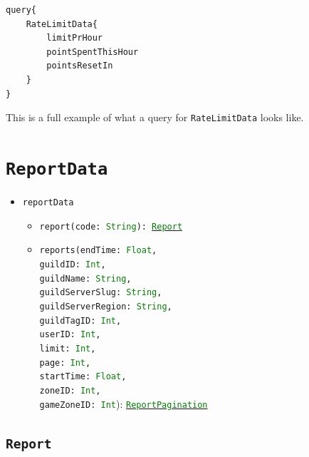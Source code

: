 \documentclass[10pt, a4paper]{memoir}
\numberwithin{equation}{section}
\theoremstyle{plain}
\theoremstyle{defp}
\theoremstyle{dotless}
\theoremstyle{definition}
\theoremstyle{dotless}
\theoremstyle{dotless}
\theoremstyle{defp}
\theoremstyle{defp}
\theoremstyle{be}          %
\theoremstyle{defp}
\newcommand\ttt[1]{\texttt{#1}}
\newcommand\type[1]{\ttt{\textcolor{green}{#1}}}
\begin{document}
\begin{lstlisting}[language=WowAPI]
query{
	RateLimitData{
		limitPrHour
		pointSpentThisHour
		pointsResetIn
	}
}
\end{lstlisting}

This is a full example of what a query for \ttt{RateLimitData} looks like. 

\newpage




\section{\ttt{ReportData}}\label{sec:ReportData}

\begin{itemize} [noitemsep,topsep=1pt]
\item \ttt{reportData}
	\begin{itemize}[noitemsep,topsep=1pt]
		\item \ttt{report(code: \type{String}): \hyperref[sec:Report]{\type{Report}}}
		\item \ttt{reports(endTime: \type{Float}, \\guildID: \type{Int}, \\guildName: \type{String}, \\guildServerSlug: \type{String}, \\guildServerRegion: \type{String}, \\guildTagID: \type{Int}, \\userID: \type{Int}, \\limit: \type{Int}, \\page: \type{Int}, \\startTime: \type{Float}, \\zoneID: \type{Int}, \\gameZoneID: \type{Int}}): \hyperref[sec:reportpagination]{\type{ReportPagination}}
	\end{itemize}
\end{itemize}

\subsection{\ttt{Report}}\label{sec:Report}
\end{document}
